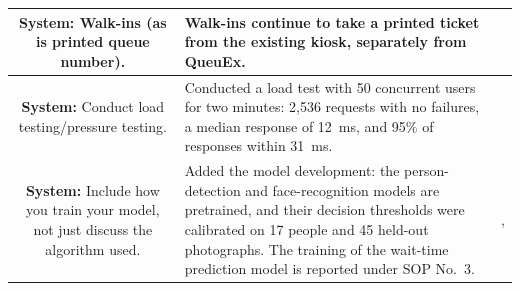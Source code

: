\documentclass[12pt,letterpaper]{article}
\newcommand{\sysname}{QueuEx}
\newcommand{\pg}[1]{\large #1}
\begin{document}
\begin{longtable}{|S|A|P|}
\textbf{System:}\newline
Walk-ins (as is printed queue number).
&
Walk-ins continue to take a printed ticket from the existing kiosk,
separately from \sysname{}.
&
\pg{\pageref{sec:scope}} \\ \hline

\textbf{System:}\newline
Conduct load testing/pressure testing.
&
Conducted a load test with 50 concurrent users for two minutes: 2,536
requests with no failures, a median response of 12~ms, and 95\% of
responses within 31~ms.
&
\pg{\pageref{subsec:load-test}} \\ \hline

\textbf{System:}\newline
Include how you train your model, not just discuss the algorithm used.
&
Added the model development: the person-detection and face-recognition
models are pretrained, and their decision thresholds were calibrated on
17 people and 45 held-out photographs. The training of the wait-time
prediction model is reported under SOP No.~3.
&
\pg{\pageref{subsec:calibration}, \pageref{sec:sop3-results}} \\ \hline

\end{longtable}
\end{document}
